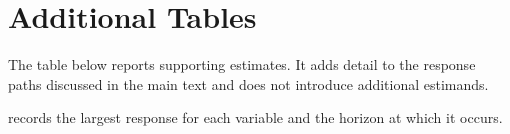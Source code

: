 \section{Additional Tables}
\label{app:additional-tables}

The table below reports supporting estimates. It adds detail to the response paths discussed in the main text and does not introduce additional estimands.

 records the largest response for each variable and the horizon at which it occurs.


